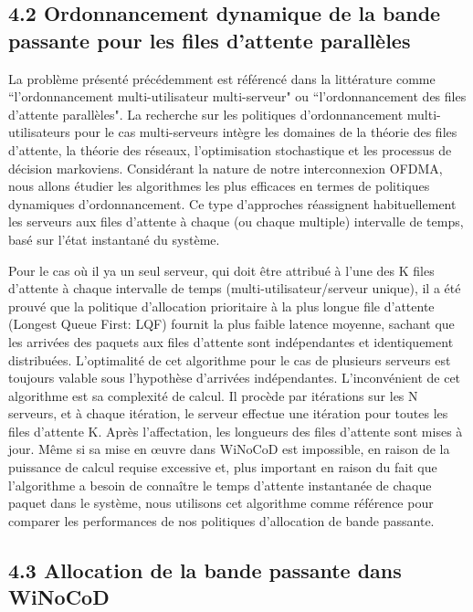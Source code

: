 \subsection*{4.2 Ordonnancement dynamique de la bande passante pour les files d'attente parallèles}

La problème présenté précédemment est référencé dans la littérature comme ``l'ordonnancement multi-utilisateur multi-serveur" ou ``l'ordonnancement des files d'attente parallèles". La recherche sur les politiques d'ordonnancement multi-utilisateurs pour le cas multi-serveurs intègre les domaines de la théorie des files d'attente, la théorie des réseaux, l’optimisation stochastique et les processus de décision markoviens. Considérant la nature de notre interconnexion OFDMA, nous allons étudier les algorithmes les plus efficaces en termes de politiques dynamiques d'ordonnancement. Ce type d’approches réassignent habituellement les serveurs aux files d'attente à chaque (ou chaque multiple) intervalle de temps, basé sur l'état instantané du système.

Pour le cas où il ya un seul serveur, qui doit être attribué à l'une des K files d'attente à chaque intervalle de temps (multi-utilisateur/serveur unique), il a été prouvé que la politique d’allocation prioritaire à la plus longue file d'attente (Longest Queue First: LQF) fournit la plus faible latence moyenne, sachant que les arrivées des paquets aux files d'attente sont indépendantes et identiquement distribuées. L'optimalité de cet algorithme pour le cas de plusieurs serveurs est toujours valable sous l'hypothèse d'arrivées indépendantes. L'inconvénient de cet algorithme est sa complexité de calcul. Il procède par itérations sur les N serveurs, et à chaque itération, le serveur effectue une itération pour toutes les files d'attente K. Après l'affectation, les longueurs des files d'attente sont mises à jour. Même si sa mise en œuvre dans WiNoCoD est impossible, en raison de la puissance de calcul requise excessive et, plus important en raison du fait que l'algorithme a besoin de connaître le temps d'attente instantanée de chaque paquet dans le système, nous utilisons cet algorithme comme référence pour comparer les performances de nos politiques d'allocation de bande passante. 

\subsection*{4.3 Allocation de la bande passante dans WiNoCoD}

